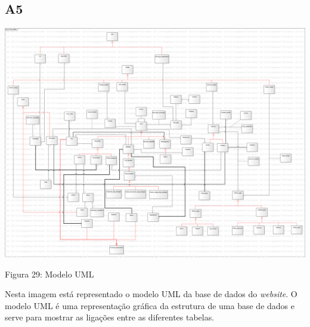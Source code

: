 \documentclass[11pt]{report}
\begin{document}
\subsection{A5}


\includegraphics[width=1\linewidth]{Class_Model.png} 
\caption{Figura 29: Modelo UML}

Nesta imagem está representado o modelo UML da base de dados do {\it website}. O modelo UML é uma representação gráfica da estrutura de uma base de dados e serve para mostrar as ligações entre as diferentes tabelas. 
\end{document}
